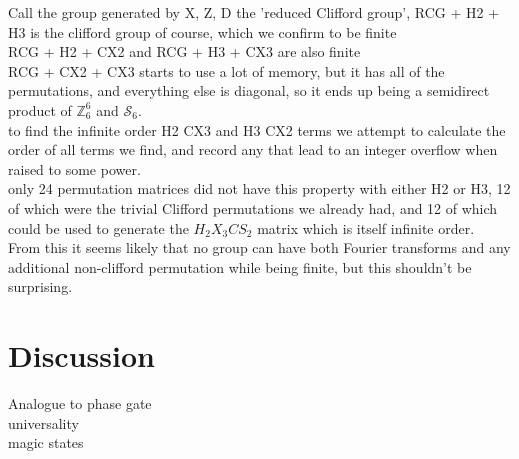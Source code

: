 Call the group generated by X, Z, D the 'reduced Clifford group', RCG + H2 + H3 is the clifford group of course, which we confirm to be finite
\\RCG + H2 + CX2 and RCG + H3 + CX3 are also finite
\\RCG + CX2 + CX3 starts to use a lot of memory, but it has all of the permutations, and everything else is diagonal, so it ends up being a semidirect product of $\mathbb{Z}_6^6$ and $\mathcal{S}_6$.
\\to find the infinite order H2 CX3 and H3 CX2 terms we attempt to calculate the order of all terms we find, and record any that lead to an integer overflow when raised to some power.
\\only 24 permutation matrices did not have this property with either H2 or H3, 12 of which were the trivial Clifford permutations we already had, and 12 of which could be used to generate the $H_2 X_3 CS_2$ matrix which is itself infinite order.
\\From this it seems likely that no group can have both Fourier transforms and any additional non-clifford permutation while being finite, but this shouldn't be surprising.

\section{Discussion}
Analogue to phase gate
\\universality
\\magic states